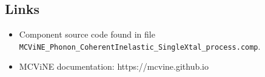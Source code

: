 \subsection*{Links}
\begin{itemize}
  \item Component source code found in file \texttt{MCViNE\_Phonon\_CoherentInelastic\_SingleXtal\_process.comp}.
  \item MCViNE documentation: https://mcvine.github.io
\end{itemize}
